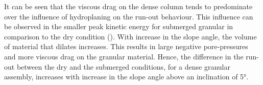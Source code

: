 It can be seen that the viscous drag on the dense column tends to predominate 
over the influence of hydroplaning on the run-out behaviour. This influence can 
be observed in the smaller peak kinetic energy for submerged granular in 
comparison to the dry condition (). With increase in 
the slope angle, the volume of material that dilates increases. This results in 
large negative pore-pressures and more viscous drag on the granular material. 
Hence, the difference in the run-out between the dry and the submerged 
conditions, for a dense granular assembly, increases with increase in the slope 
angle above an inclination of 5\si{\degree}.


\begin{figure}
\\

\\


\end{figure}

